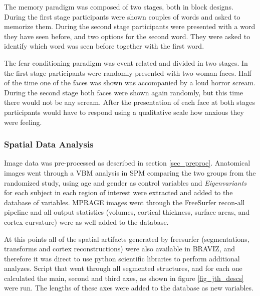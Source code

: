 The memory paradigm was composed of two stages, both in block designs. During the first stage participants were shown couples of words and asked to memorize them. During the second stage participants were presented with a word they have seen before, and two options for the second word. They were asked to identify which word was seen before together with the first word.


The fear conditioning paradigm was event related and divided in two stages. In the first stage participants were randomly presented with two woman faces. Half of the time one of the faces was shown was accompanied by a loud horror scream.  During the second stage  both faces were shown again randomly, but this time there would not be any scream. After the presentation of each face at both stages participants would have to respond using a qualitative scale how anxious they were feeling.
\smallskip

\subsubsection{Spatial Data Analysis}

Image data was pre-processed as described in section \ref{sec_preproc}. Anatomical images went through a VBM analysis in SPM comparing the two groups from the randomized study, using age and gender as control variables and \emph{Eigenvariants} for each subject in each region of interest were extracted and added to the database of variables. MPRAGE images went through the FreeSurfer recon-all pipeline and all output statistics (volumes, cortical thickness, surface areas, and cortex curvature) were as well added to the database. 

At this points all of the spatial artifacts  generated by freesurfer (segmentations, transforms and cortex reconstructions) were also available in BRAVIZ, and therefore it was direct to use python scientific libraries to perform additional analyzes. Script that went through all segmented structures, and for each one calculated the main, second and third axes, as shown in figure \ref{fig_jth_descs} were run. The lengths of these axes were added to the database as new variables.

